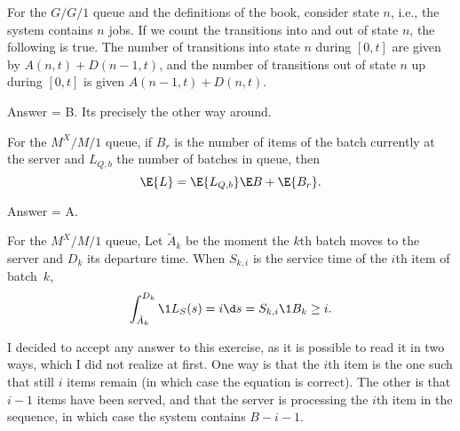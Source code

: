 \begin{exercise}[201804]
For the $G/G/1$ queue and the definitions of the book, consider state $n$, i.e., the system contains $n$ jobs. If we count the transitions into and out of state $n$, the following is true. The number of transitions into state $n$ during $[0,t]$ are given by $A(n,t) + D(n-1,t)$, and the number of transitions out of state $n$ up during $[0,t]$ is given $A(n-1,t) + D(n,t)$.
\begin{solution}
Answer = B. Its precisely the other way around. 
\end{solution}
\end{exercise}

\begin{exercise}[201804]
For the $M^X/M/1$ queue, if $B_r$ is the number of items of the batch currently at the server and $L_{Q,b}$ the number of batches in queue, then
\begin{equation*}
 \E{L} = \E{L_{Q,b}}\E B + \E{B_r}.
\end{equation*}
\begin{solution}
Answer = A.
\end{solution}
\end{exercise}

\begin{exercise}[201804]
For the $M^X/M/1$ queue, 
Let $\tilde A_k$ be the moment the $k$th batch moves to the server and $D_k$ its departure time. When $S_{k,i}$ is the service time of the $i$th item of batch~$k$, 
\begin{equation*}
 \int_{\tilde A_k}^{D_k} \1{L_S(s)=i} \d s = S_{k,i} \1{B_k \geq i}.
\end{equation*}
\begin{solution}
I decided to accept any answer to this exercise, as it is possible to read it in two ways, which I did not realize at first. One way is that the $i$th item is the one such that still $i$ items remain (in which case the equation is correct). The other is that $i-1$ items have been served, and that the server is processing the $i$th item in the sequence, in which case the system contains $B-i-1$. 
\end{solution}
\end{exercise}

